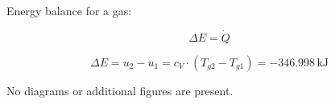 Energy balance for a gas:  

\[
\Delta E = \dot{Q}
\]

\[
\Delta E = u_2 - u_1 = c_V \cdot (T_{g2} - T_{g1}) = -346.998 \, \text{kJ}
\]  

No diagrams or additional figures are present.